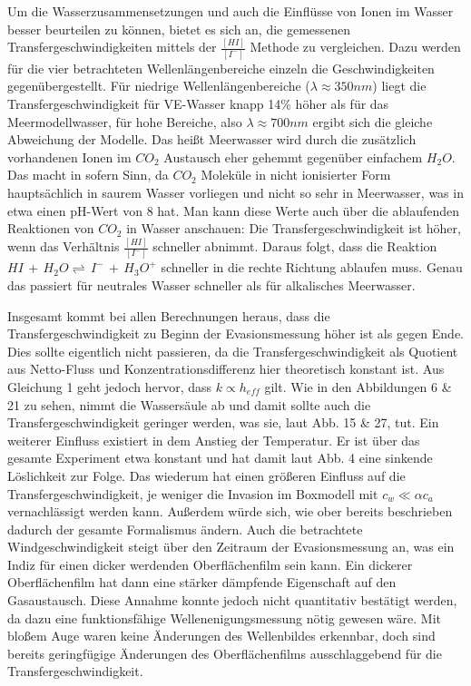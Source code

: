\documentclass[12pt]{article}
\begin{document}
Um die Wasserzusammensetzungen und auch die Einflüsse von Ionen im Wasser besser beurteilen zu können, bietet es sich an, die gemessenen Transfergeschwindigkeiten mittels der $\frac{[HI]}{[I^-]}$ Methode zu vergleichen. Dazu werden für die vier betrachteten Wellenlängenbereiche einzeln die Geschwindigkeiten gegenübergestellt. 
Für niedrige Wellenlängenbereiche ($\lambda \approx 350 nm$) liegt die Transfergeschwindigkeit für VE-Wasser knapp 14\% höher als für das Meermodellwasser, für hohe Bereiche, also $\lambda \approx 700 nm$ ergibt sich die gleiche Abweichung der Modelle. Das heißt Meerwasser wird durch die zusätzlich vorhandenen Ionen im $CO_2$ Austausch eher gehemmt gegenüber einfachem $H_2O$.
Das macht in sofern Sinn, da $CO_2$ Moleküle in nicht ionisierter Form hauptsächlich in saurem Wasser vorliegen und nicht so sehr in Meerwasser, was in etwa einen pH-Wert von 8 hat.
Man kann diese Werte auch über die ablaufenden Reaktionen von $CO_2$ in Wasser anschauen:
Die Transfergeschwindigkeit ist höher, wenn das Verhältnis $\frac{[HI]}{[I^-]}$ schneller abnimmt. Daraus folgt, dass die Reaktion $HI \, + \, H_2O \rightleftharpoons \, I^- \, + \, H_3O^+$ schneller in die rechte Richtung ablaufen muss. Genau das passiert für neutrales Wasser schneller als für alkalisches Meerwasser.

Insgesamt kommt bei allen Berechnungen heraus, dass die Transfergeschwindigkeit zu Beginn der Evasionsmessung höher ist als gegen Ende. Dies sollte eigentlich nicht passieren, da die Transfergeschwindigkeit als Quotient aus Netto-Fluss und Konzentrationsdifferenz hier theoretisch konstant ist. Aus Gleichung 1 geht jedoch hervor, dass $k \propto h_{eff}$ gilt.
Wie in den Abbildungen 6 \& 21 zu sehen, nimmt die Wassersäule ab und damit sollte auch die Transfergeschwindigkeit geringer werden, was sie, laut Abb. 15 \& 27, tut.
Ein weiterer Einfluss existiert in dem Anstieg der Temperatur. Er ist über das gesamte Experiment etwa konstant und hat damit laut \cite{jaehne} Abb. 4 eine sinkende Löslichkeit zur Folge. Das wiederum hat einen größeren Einfluss auf die Transfergeschwindigkeit, je weniger die Invasion im Boxmodell mit $c_w \ll \alpha c_a $ vernachlässigt werden kann. Außerdem würde sich, wie ober bereits beschrieben dadurch der gesamte Formalismus ändern. 
Auch die betrachtete Windgeschwindigkeit steigt über den Zeitraum der Evasionsmessung an, was ein Indiz für einen dicker werdenden Oberflächenfilm sein kann. Ein dickerer Oberflächenfilm hat dann eine stärker dämpfende Eigenschaft auf den Gasaustausch. Diese Annahme konnte jedoch nicht quantitativ bestätigt werden, da dazu eine funktionsfähige Wellenenigungsmessung nötig gewesen wäre. Mit bloßem Auge waren keine Änderungen des Wellenbildes erkennbar, doch sind bereits geringfügige Änderungen des Oberflächenfilms ausschlaggebend für die Transfergeschwindigkeit. 
\end{document}
